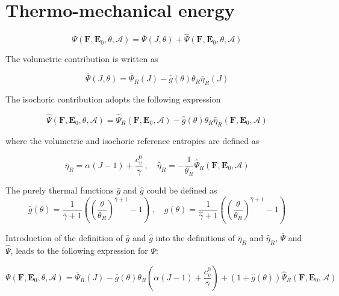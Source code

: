 \documentclass[a4paper,12pt]{article}
\newcommand{\A}{\mathcal{A}}
\newcommand{\E}{\mathbf{E}}
\newcommand{\F}{\mathbf{F}}
\newcommand{\0}{\mathbf{0}}
\begin{document}
\setcounter{equation}{11}
\section{Thermo-mechanical energy}

\begin{equation}
  \Psi(\F, \E_0, \theta, \A) = \bar{\Psi}(J,\theta) + \hat{\Psi}(\F, \E_0, \theta, \A)
\end{equation}

The volumetric contribution is written as

\begin{equation}
  \bar{\Psi}(J,\theta) = \bar{\Psi}_R(J) - \bar{g}(\theta) \theta_R \bar{\eta}_R(J)
\end{equation}

The isochoric contribution adopts the following expression

\begin{equation}
  \hat{\Psi}(\F, \E_0, \theta, \A) = \hat{\Psi}_R(\F, \E_0, \A) - \hat{g}(\theta) \theta_R \hat{\eta}_R(\F, \E_0, \A)
\end{equation}

where the volumetric and isochoric reference entropies are defined as

\begin{equation}
  \bar{\eta}_R = \alpha(J - 1) + \frac{c_v^0}{\bar\gamma} \ , \quad
    \hat{\eta}_R = -\frac{1}{\theta_R} \hat{\Psi}_R(\F, \E_0, \A)
\end{equation}

The purely thermal functions $\bar{g}$ and $\hat{g}$ could be defined as
\begin{equation}
  \bar{g}(\theta) = \frac{1}{\bar\gamma+1}\left(\left(\frac{\theta}{\theta_R}\right)^{\bar\gamma+1}-1\right) \ , \quad
  \hat{g}(\theta) = \frac{1}{\hat\gamma+1}\left(\left(\frac{\theta}{\theta_R}\right)^{\hat\gamma+1}-1\right)
\end{equation}


Introduction of the definition of  $\bar{g}$ and $\hat{g}$ into the definitions of $\bar{\eta}_R$ and $\hat{\eta}_R$, $\bar{\Psi}$ and $\hat{\Psi}$, leads to the following expression for $\Psi$:

\begin{equation}
    \Psi(\F,\E_0,\theta,\A) = \bar{\Psi}_R(J) - \bar{g}(\theta) \theta_R
        \left(\alpha(J - 1) + \frac{c_v^0}{\bar\gamma}\right) +
    \left(1 + \hat{g}(\theta)\right)
        \hat{\Psi}_R(\F,\E_0,\A)
\end{equation}
\end{document}
